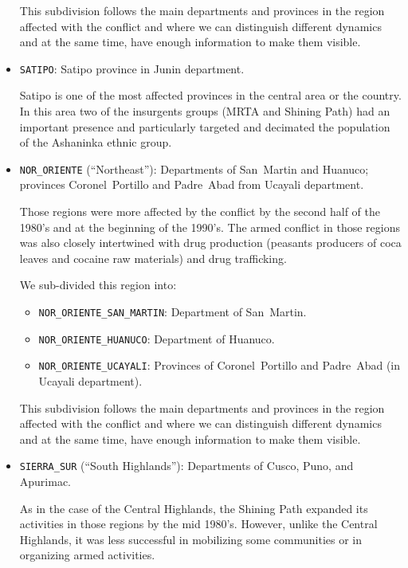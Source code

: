\documentclass{article}
\begin{document}
\begin{itemize}
    This subdivision follows the main departments and provinces in the region affected with the conflict and where we can distinguish different dynamics and at the same time, have enough information to make them visible.
    
\item \texttt{SATIPO}: Satipo province in Junin department.

    Satipo is one of the most affected provinces in the central area or the country. In this area two of the insurgents groups (MRTA and Shining Path) had an important presence and particularly targeted and decimated the population of the Ashaninka ethnic group. 

 

  \item \texttt{NOR\_ORIENTE} (``Northeast''): Departments of San~Martin and Huanuco; provinces Coronel~Portillo and Padre~Abad from Ucayali department.

    Those regions were more affected by the conflict by the second half of the 1980's and at the beginning of the 1990's. The armed conflict in those regions was also closely intertwined with drug production (peasants producers of coca leaves and cocaine raw materials) and drug trafficking. 

    We sub-divided this region into:
    \begin{itemize}
      \item \texttt{NOR\_ORIENTE\_SAN\_MARTIN}: Department of San~Martin.
      \item \texttt{NOR\_ORIENTE\_HUANUCO}: Department of Huanuco.
      \item \texttt{NOR\_ORIENTE\_UCAYALI}: Provinces of Coronel~Portillo and Padre~Abad (in Ucayali department).
    \end{itemize}

    This subdivision follows the main departments and provinces in the region affected with the conflict and where we can distinguish different dynamics and at the same time, have enough information to make them visible.

  \item  \texttt{SIERRA\_SUR} (``South Highlands''): Departments of Cusco, Puno, and Apurimac.

As in the case of the Central Highlands, the Shining Path expanded its activities in those regions by the mid 1980's. However, unlike the Central Highlands, it was less successful in mobilizing some communities or in organizing armed activities.


\end{itemize}
\end{document}
